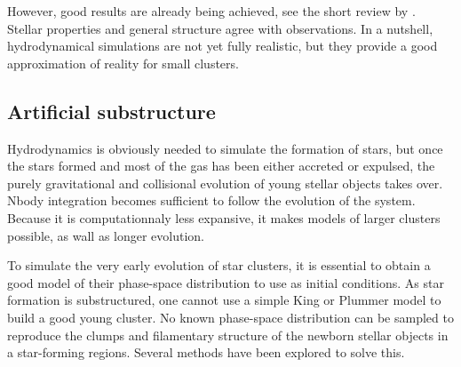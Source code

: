 However, good results are already being achieved, see the short review by \cite{Clarke2012}. Stellar properties and general structure agree with observations. In a nutshell, hydrodynamical simulations are not yet fully realistic, but they provide a good approximation of reality for small clusters.


\subsection{Artificial substructure}

Hydrodynamics is obviously needed to simulate the formation of stars, but once the stars formed and most of the gas has been either accreted or expulsed, the purely gravitational and collisional evolution of young stellar objects takes over. Nbody integration becomes sufficient to follow the evolution of the system. Because it is computationnaly less expansive, it makes models of larger clusters possible, as wall as longer evolution.

 To simulate the very early evolution of star clusters, it is essential to obtain a good model of their phase-space distribution to use as initial conditions. As star formation is substructured, one cannot use a simple King or Plummer model to build a good young cluster. No known phase-space distribution can be sampled to reproduce the clumps and filamentary structure of the newborn stellar objects in a star-forming regions. Several methods have been explored to solve this.
 
